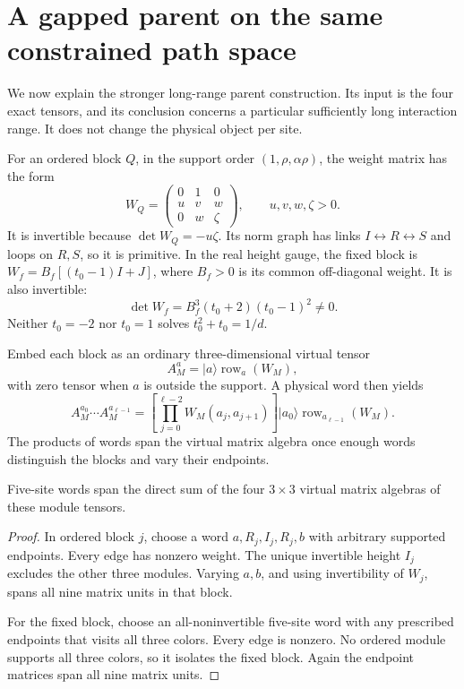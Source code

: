 \section{A gapped parent on the same constrained path space}

We now explain the stronger long-range parent construction. Its
input is the four exact tensors, and its conclusion concerns a
particular sufficiently long interaction range. It does not change
the physical object per site.

For an ordered block $Q$, in the support order $(1,\rho,\alpha\rho)$,
the weight matrix has the form
\[
 W_Q=\begin{pmatrix}0&1&0\\u&v&w\\0&w&\zeta\end{pmatrix},
 \qquad u,v,w,\zeta>0.
\]
It is invertible because $\det W_Q=-u\zeta$. Its norm graph has
links $I\leftrightarrow R\leftrightarrow S$ and loops on $R,S$,
so it is primitive. In the real height gauge, the fixed block is
$W_f=B_f[(t_0-1)I+J]$, where $B_f>0$ is its common off-diagonal
weight. It is also invertible:
\[
 \det W_f=B_f^3(t_0+2)(t_0-1)^2\ne0.
\]
Neither $t_0=-2$ nor $t_0=1$ solves $t_0^2+t_0=1/d$.

Embed each block as an ordinary three-dimensional virtual tensor
\[
 A_M^a=|a\rangle\operatorname{row}_a(W_M),
\]
with zero tensor when $a$ is outside the support. A physical word
then yields
\[
 A_M^{a_0}\cdots A_M^{a_{\ell-1}}
 =\left[\prod_{j=0}^{\ell-2}W_M(a_j,a_{j+1})\right]
 |a_0\rangle\operatorname{row}_{a_{\ell-1}}(W_M).
\]
The products of words span the virtual matrix algebra once enough
words distinguish the blocks and vary their endpoints.

\begin{proposition}
Five-site words span the direct sum of the four $3\times3$ virtual
matrix algebras of these module tensors.
\end{proposition}
\begin{proof}
In ordered block $j$, choose a word
$a,R_j,I_j,R_j,b$ with arbitrary supported endpoints. Every edge
has nonzero weight. The unique invertible height $I_j$ excludes
the other three modules. Varying $a,b$, and using invertibility of
$W_j$, spans all nine matrix units in that block.

For the fixed block, choose an all-noninvertible five-site word with
any prescribed endpoints that visits all three colors. Every edge
is nonzero. No ordered module supports all three colors, so it
isolates the fixed block. Again the endpoint matrices span all
nine matrix units.\end{proof}

